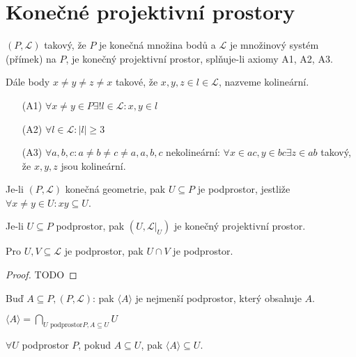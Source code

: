 \section{\texorpdfstring{Konečné projektivní prostory}{Konečné projektivní prostory}}

\begin{definition}
    $(P,\mathcal{L})$ takový, že $P$ je konečná množina bodů a $\mathcal{L}$ je množinový systém (přímek) na $P$, je konečný projektivní prostor, splňuje-li axiomy A1, A2, A3.

    Dále body $x\neq y\neq z\neq x$ takové, že $x,y,z\in l\in\mathcal{L}$, nazveme kolineární.

    \begin{itemize}
        \item[(A1)] $\forall x\neq y\in P\exists! l\in \mathcal{L}: x,y\in l$
        \item[(A2)] $\forall l\in\mathcal{L}: |l|\geq 3$
        \item[(A3)]  $\forall a,b,c: a\neq b\neq c\neq a, a,b,c$ nekolineární: $\forall x\in ac, y\in bc\exists z\in ab$ takový, že $x,y,z$ jsou kolineární.
    \end{itemize}
\end{definition}
\begin{definition}[Podprostor]
    Je-li $(P,\mathcal{L})$ konečná geometrie, pak $U\subseteq P$ je podprostor, jestliže $\forall x\neq y\in U: xy\subseteq U$.
\end{definition}
\begin{note}
    Je-li $U\subseteq P$ podprostor, pak $(U,\mathcal{L}|_U)$ je konečný projektivní prostor.
\end{note}
\begin{lemma}
    Pro $U,V\subseteq \mathcal{L}$ je podprostor, pak $U\cap V$ je podprostor.
\end{lemma}
\begin{proof}
    TODO
\end{proof}
\begin{definition}[Obal]
    Buď $A\subseteq P, (P,\mathcal{L})$: pak $\langle A\rangle$ je nejmenší podprostor, který obsahuje $A$.
\end{definition}
\begin{note}
    $\langle A\rangle = \bigcap_{U \text{ podprostor} P, A\subseteq U} U$

    $\forall U$ podprostor $P$, pokud $A\subseteq U$, pak $\langle A\rangle\subseteq U$.
\end{note}
